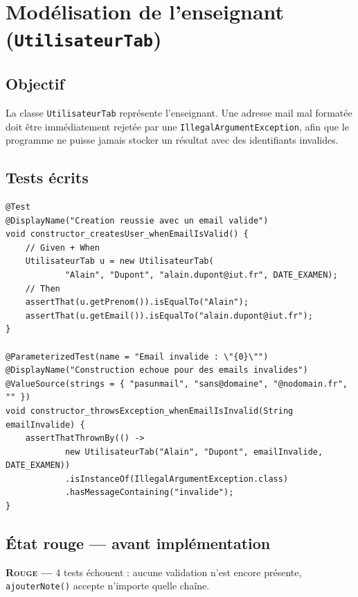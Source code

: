 \documentclass[a4paper,12pt]{article}
\newcommand{\etatrouge}[1]{%
  \begin{mdframed}[linecolor=rouge,linewidth=2pt,backgroundcolor=rouge!8]%
    \textcolor{rouge}{\textbf{\textsc{Rouge} ---}} #1%
  \end{mdframed}%
}
\begin{document}
\section{Modélisation de l'enseignant (\texttt{UtilisateurTab})}

\subsection{Objectif}

La classe \texttt{UtilisateurTab} représente l'enseignant. Une adresse mail
mal formatée doit être immédiatement rejetée par une
\texttt{IllegalArgumentException}, afin que le programme ne puisse jamais
stocker un résultat avec des identifiants invalides.

\subsection{Tests écrits}

\begin{lstlisting}[style=java, caption={\texttt{UtilisateurTabTest.java} --- extrait}]
@Test
@DisplayName("Creation reussie avec un email valide")
void constructor_createsUser_whenEmailIsValid() {
    // Given + When
    UtilisateurTab u = new UtilisateurTab(
            "Alain", "Dupont", "alain.dupont@iut.fr", DATE_EXAMEN);
    // Then
    assertThat(u.getPrenom()).isEqualTo("Alain");
    assertThat(u.getEmail()).isEqualTo("alain.dupont@iut.fr");
}

@ParameterizedTest(name = "Email invalide : \"{0}\"")
@DisplayName("Construction echoue pour des emails invalides")
@ValueSource(strings = { "pasunmail", "sans@domaine", "@nodomain.fr", "" })
void constructor_throwsException_whenEmailIsInvalid(String emailInvalide) {
    assertThatThrownBy(() ->
            new UtilisateurTab("Alain", "Dupont", emailInvalide, DATE_EXAMEN))
            .isInstanceOf(IllegalArgumentException.class)
            .hasMessageContaining("invalide");
}
\end{lstlisting}

\subsection{État rouge --- avant implémentation}

\etatrouge{4 tests échouent : aucune validation n'est encore présente,
\texttt{ajouterNote()} accepte n'importe quelle chaîne.}
\end{document}
